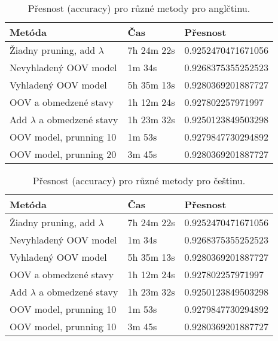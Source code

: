 \documentclass[a4paper, 10.5pt]{article}
\begin{document}
\begin{table}[H]
\centering
\begin{tabular}{lll}
\toprule
\textbf{Metóda} & \textbf{Čas} & \textbf{Přesnost} \\
\midrule
Žiadny pruning, add $\lambda$ & 7h 24m 22s  & 0.9252470471671056\\
Nevyhladený OOV model & 1m 34s & 0.9268375355252523\\
Vyhladený OOV model & 5h 35m 13s  & 0.9280369201887727\\
OOV a obmedzené stavy & 1h 12m 24s & 0.927802257971997\\
Add $\lambda$ a obmedzené stavy & 1h 23m 32s & 0.9250123849503298\\
OOV model, prunning 10 & 1m 53s & 0.9279847730294892\\
OOV model, prunning 20 & 3m 45s & 0.9280369201887727\\
\bottomrule
\end{tabular}
\caption{Přesnost (accuracy) pro různé metody pro anglčtinu.}
\label{eng_big}
\end{table}

\begin{table}[H]
\centering
\begin{tabular}{lll}
\toprule
\textbf{Metóda} & \textbf{Čas} & \textbf{Přesnost} \\
\midrule
Žiadny pruning, add $\lambda$ & 7h 24m 22s  & 0.9252470471671056\\
Nevyhladený OOV model & 1m 34s & 0.9268375355252523\\
Vyhladený OOV model & 5h 35m 13s  & 0.9280369201887727\\
OOV a obmedzené stavy & 1h 12m 24s & 0.927802257971997\\
Add $\lambda$ a obmedzené stavy & 1h 23m 32s & 0.9250123849503298\\
OOV model, prunning 10 & 1m 53s & 0.9279847730294892\\
OOV model, prunning 10 & 3m 45s & 0.9280369201887727\\
\bottomrule
\end{tabular}
\caption{Přesnost (accuracy) pro různé metody pro češtinu.}
\label{eng_big}
\end{table}
\end{document}
